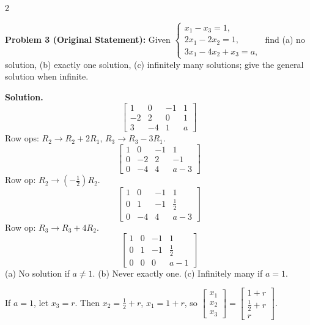 \documentclass[8pt]{extarticle}
\begin{document}
\begin{multicols}{2}
\begin{tcolorbox}[title=]
\noindent
\textbf{Problem 3 (Original Statement):}
Given
\(
\begin{cases}
x_{1}-x_{3}=1,\\
2x_{1}-2x_{2}=1,\\
3x_{1}-4x_{2}+x_{3}=a,
\end{cases}
\)
find (a) no solution, (b) exactly one solution, (c) infinitely many solutions; give the general solution when infinite.

\textbf{Solution.}
\[
\left[
\begin{array}{ccc|c}
1&0&-1&1\\
-2&2&0&1\\
3&-4&1&a
\end{array}
\right]
\]
Row ops: \(R_{2}\to R_{2}+2R_{1}\), \(R_{3}\to R_{3}-3R_{1}\).
\[
\left[
\begin{array}{ccc|c}
1&0&-1&1\\
0&-2&2&-1\\
0&-4&4&a-3
\end{array}
\right]
\]
Row op: \(R_{2}\to (-\tfrac12)R_{2}\).
\[
\left[
\begin{array}{ccc|c}
1&0&-1&1\\
0&1&-1&\tfrac12\\
0&-4&4&a-3
\end{array}
\right]
\]
Row op: \(R_{3}\to R_{3}+4R_{2}\).
\[
\left[
\begin{array}{ccc|c}
1&0&-1&1\\
0&1&-1&\tfrac12\\
0&0&0&a-1
\end{array}
\right]
\]
(a) No solution if \(a\neq1\). \quad (b) Never exactly one. \quad (c) Infinitely many if \(a=1\).

If \(a=1\), let \(x_{3}=r\). Then \(x_{2}=\tfrac12+r\), \(x_{1}=1+r\), so
\(
\begin{bmatrix}x_{1}\\x_{2}\\x_{3}\end{bmatrix}
=\begin{bmatrix}1+r\\ \tfrac12+r\\ r\end{bmatrix}.
\)
\end{tcolorbox}


\end{multicols}
\end{document}
